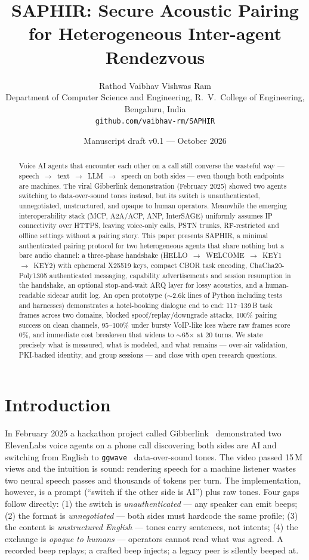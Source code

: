 \documentclass[11pt]{article}
\title{SAPHIR: Secure Acoustic Pairing for Heterogeneous Inter-agent Rendezvous}
\author{Rathod Vaibhav Vishwas Ram\\{\small Department of Computer Science and Engineering, R.~V.~College of Engineering, Bengaluru, India}\\\small\texttt{github.com/vaibhav-rm/SAPHIR}}
\date{\small Manuscript draft v0.1 --- October 2026}
\begin{document}
\maketitle

\begin{abstract}
Voice AI agents that encounter each other on a call still converse the wasteful
way --- speech~$\to$~text~$\to$~LLM~$\to$~speech on both sides --- even though
both endpoints are machines. The viral Gibberlink demonstration (February 2025)
showed two agents switching to data-over-sound tones instead, but its switch is
unauthenticated, unnegotiated, unstructured, and opaque to human operators.
Meanwhile the emerging interoperability stack (MCP, A2A/ACP, ANP, InterSAGE)
uniformly assumes IP connectivity over HTTPS, leaving voice-only calls, PSTN
trunks, RF-restricted and offline settings without a pairing story. This paper
presents SAPHIR, a minimal authenticated pairing protocol for two heterogeneous
agents that share nothing but a bare audio channel: a three-phase handshake
(HELLO~$\to$~WELCOME~$\to$~KEY1~$\to$~KEY2) with ephemeral X25519 keys, compact
CBOR task encoding, ChaCha20-Poly1305 authenticated messaging, capability
advertisements and session resumption in the handshake, an optional
stop-and-wait ARQ layer for lossy acoustics, and a human-readable sidecar audit
log. An open prototype ($\sim$2.6k lines of Python including tests and harnesses) demonstrates a hotel-booking
dialogue end to end: 117--139\,B task frames across two domains, blocked spoof/replay/downgrade
attacks, 100\% pairing success on clean channels, 95--100\% under bursty
VoIP-like loss where raw frames score 0\%, and immediate cost breakeven that
widens to $\sim$65$\times$ at 20 turns. We state precisely what is measured,
what is modeled, and what remains --- over-air validation, PKI-backed identity,
and group sessions --- and close with open research questions.
\end{abstract}

\section{Introduction}
In February 2025 a hackathon project called Gibberlink~\cite{gibberlink}
demonstrated two ElevenLabs voice agents on a phone call discovering both sides
are AI and switching from English to \texttt{ggwave}~\cite{ggwave}
data-over-sound tones. The video passed 15\,M views and the intuition is sound:
rendering speech for a machine listener wastes two neural speech passes and
thousands of tokens per turn. The implementation, however, is a prompt (``switch
if the other side is AI'') plus raw tones. Four gaps follow directly: (1) the
switch is \emph{unauthenticated} --- any speaker can emit beeps; (2) the format
is \emph{unnegotiated} --- both sides must hardcode the same profile; (3) the
content is \emph{unstructured English} --- tones carry sentences, not intents;
(4) the exchange is \emph{opaque to humans} --- operators cannot read what was
agreed. A recorded beep replays; a crafted beep injects; a legacy peer is
silently beeped at.
\end{document}
